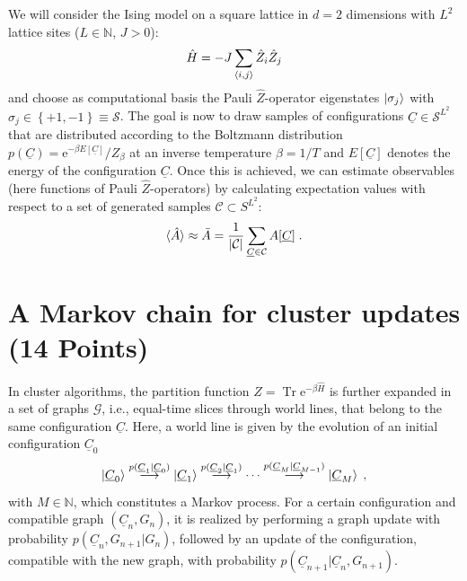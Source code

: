\documentclass[a4paper, 12pt]{article}
\begin{document}
%
We will consider the Ising model on a square lattice in $d=2$ dimensions with $L^2$ lattice sites ($L\in\mathbb N$, $J>0$):
\begin{equation}
	\hat H = -J\sum_{\braket{i,j}} \hat Z_i \hat Z_j
\end{equation}
and choose as computational basis the Pauli $\hat Z$-operator eigenstates $\ket{\sigma_j}$ with $\sigma_j \in \left\{+1, -1 \right\} \equiv \mathcal S$.
%
The goal is now to draw samples of configurations $\underline C \in \mathcal S^{L^2}$ that are distributed according to the Boltzmann distribution $p(\underline C) = \mathrm{e}^{-\beta E[\underline C]}/Z_\beta$ at an inverse temperature $\beta = 1/T$ and $E[\underline C]$ denotes the energy of the configuration $\underline C$.
%
Once this is achieved, we can estimate observables (here functions of Pauli $\hat Z$-operators) by calculating expectation values with respect to a set of generated samples $\mathcal C \subset S^{L^2}$:
\begin{equation}
	\braket{\hat A} \approx \bar A = \frac{1}{\lvert \mathcal C \rvert} \sum_{\underline C \in \mathcal C} A[\underline C] \; .
\end{equation}
%
\section{A Markov chain for cluster updates \textbf{(14 Points)}}
%
In cluster algorithms, the partition function $Z=\operatorname{Tr} \mathrm{e}^{-\beta \hat H}$ is further expanded in a set of graphs $\mathcal G$, i.e., equal-time slices through world lines, that belong to the same configuration $\underline C$.
%
Here, a world line is given by the evolution of an initial configuration $\underline C_0$
\begin{equation}
	\ket{\underline C_0} \stackrel{p(\underline C_1|\underline C_0)}{\longrightarrow} \ket{\underline C_1} \stackrel{p(\underline C_2|\underline C_1)}{\longrightarrow} \cdots \stackrel{p(\underline C_M|\underline C_{M-1})}{\longrightarrow} \ket{\underline C_M} \; ,
\end{equation}
with $M\in\mathbb N$, which constitutes a Markov process.
%
For a certain configuration and compatible graph $(\underline C_n, G_n)$, it is realized by performing a graph update with probability $p(\underline C_n, G_{n+1} | G_{n})$, followed by an update of the configuration, compatible with the new graph, with probability $p(\underline C_{n+1}|\underline C_n, G_{n+1})$.
%
\end{document}
